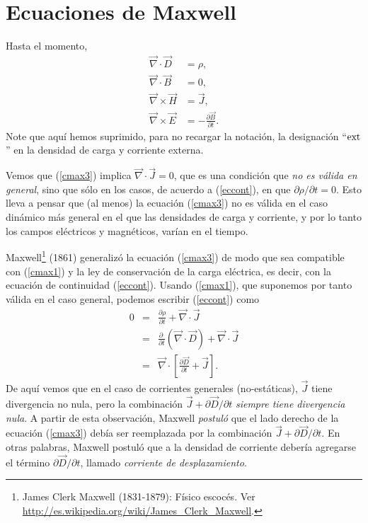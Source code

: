 \section{Ecuaciones de Maxwell}
Hasta el momento,
\begin{align}
\vec\nabla\cdot\vec{D} & =\rho ,\label{cmax1}\\
\vec\nabla\cdot\vec{B}  & =0 ,\label{cmax2}\\
\vec\nabla\times\vec{H}  & =\vec{J} ,\label{cmax3}\\
\vec\nabla\times\vec{E}  & =-\frac{\partial\vec{B}}{\partial t} .\label{cmax4}
\end{align}
Note que aquí hemos suprimido, para no recargar la notación, la designación ``${\rm ext}$'' en la densidad de carga y corriente externa.

Vemos que (\ref{cmax3}) implica $\vec\nabla\cdot\vec{J}=0$, que es una condición que \textit{no es válida en general}, sino que sólo en los casos, de acuerdo a (\ref{eccont}), en que ${\partial\rho}/{\partial t}=0$. Esto lleva a pensar que (al menos) la ecuación (\ref{cmax3}) no es válida en el caso dinámico más general en el que las densidades de carga y corriente, y por lo tanto los campos eléctricos y magnéticos, varían en el tiempo.

Maxwell\footnote{James Clerk Maxwell (1831-1879): Físico escocés. Ver \url{http://es.wikipedia.org/wiki/James_Clerk_Maxwell}.} (1861) generalizó la ecuación (\ref{cmax3}) de modo que sea compatible con (\ref{cmax1}) y la ley de conservación de la carga eléctrica,
es decir, con la ecuación de continuidad (\ref{eccont}). Usando (\ref{cmax1}), que suponemos por tanto válida en el caso general, podemos escribir (\ref{eccont}) como
\begin{eqnarray}
 0&=&\frac{\partial\rho}{\partial t}+\vec{\nabla}\cdot\vec{J}\\
&=& \frac{\partial\ }{\partial
t}\left(\vec\nabla\cdot\vec{D}\right)+\vec{\nabla}\cdot\vec{J}\\
&=& \vec\nabla\cdot\left[\frac{\partial\vec{D}}{\partial t}
+\vec{J}\right].
\end{eqnarray}
De aquí vemos que en el caso de corrientes generales (no-estáticas), $\vec{J}$ tiene divergencia no nula, pero la combinación $\vec{J}+{\partial\vec{D}}/{\partial t}$ \textit{siempre tiene divergencia nula}. A partir de esta observación, Maxwell \textit{postuló} que el lado derecho de la ecuación (\ref{cmax3}) debía ser reemplazada por la combinación $\vec{J}+{\partial\vec{D}}/{\partial t}$. En otras palabras, Maxwell postuló que a la densidad de corriente debería agregarse el término ${\partial\vec{D}}/{\partial t}$, llamado \textit{corriente de desplazamiento}.

